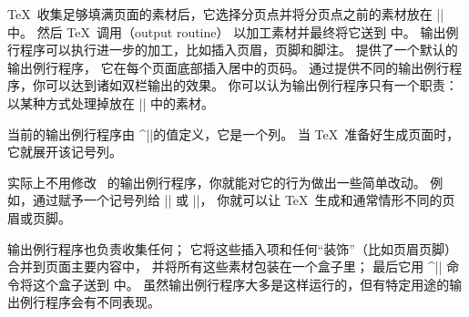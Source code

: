 {{{{{%

\TeX\ 收集足够填满页面的素材后，它选择分页点并将分页点之前的素材放在 || 中。
然后 \TeX\ 调用（output routine）%
以加工素材并最终将它送到 \dvifile 中。
输出例行程序可以执行进一步的加工，比如插入页眉，页脚和脚注。
 提供了一个默认的输出例行程序，
它在每个页面底部插入居中的页码。
通过提供不同的输出例行程序，你可以达到诸如双栏输出的效果。
你可以认为输出例行程序只有一个职责：
以某种方式处理掉放在 || 中的素材。

当前的输出例行程序由 ^|\output|\ctsref{\output}的值定义，它是一个列。
当 \TeX\ 准备好生成页面时，它就展开该记号列。

实际上不用修改 \plainTeX\ 的输出例行程序，你就能对它的行为做出一些简单改动。
例如，通过赋予一个记号列给 |\headline| 或 |\footline|\ctsref{\footline}，%
你就可以让 \TeX\ 生成和通常情形不同的页眉或页脚。

输出例行程序也负责收集任何；
它将这些插入项和任何“装饰”（比如页眉页脚）合并到页面主要内容中，
并将所有这些素材包装在一个盒子里；
最后它用 ^|\shipout| 命令\ctsref{\shipout}将这个盒子送到 \dvifile 中。
虽然输出例行程序大多是这样运行的，但有特定用途的输出例行程序会有不同表现。
\endconcept


}}}}}
